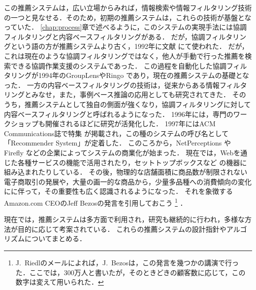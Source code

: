 この推薦システムは，広い立場からみれば，情報検索や情報フィルタリング技術の一つと見なせる．そのため，初期の推薦システムは，これらの技術が基盤となっていた．
\ref{chap:process}章で述べるように，このシステムの実現手法には協調フィルタリングと内容ベースフィルタリングがある．
だが，協調フィルタリングという語の方が推薦システムより古く，1992年に文献 \cite{macm:92:01} にて使われた．
だが，これは現在のような協調フィルタリングではなく，他人が手動で行った推薦を検索できる協調作業支援のシステムであった．
この過程を自動化した協調フィルタリングが1994年のGroupLens\cite{cscw:94:01}やRingo \cite{sigchi:95:02}であり，現在の推薦システムの基礎となった．
一方の内容ベースフィルタリングの技術は，従来からある情報フィルタリングとみなせ，また，事例ベース推論の応用としても研究されてきた．
そのうち，推薦システムとして独自の側面が強くなり，協調フィルタリングに対して内容ベースフィルタリングと呼ばれるようになった．
1996年には，専門のワークショップも開催されるほどに研究が活発化した．
1997年にはACM Communications誌で特集\cite{macm:97:01} が掲載され，この種のシステムの呼び名として「Recommender System」が定着した．
このころから，NetPerceptions や Firefly などの企業によってシステムの商業化が始まった．
現在では，Webを通じた各種サービスの機能で活用されたり\cite{ieeem:99:02,ieeem:03:01,www:07:01}，セットトップボックスなど
の機器に組み込まれたり\cite{kdd:04:11}している．
その後，物理的な店舗面積に商品数が制限されない電子商取引の発展や，大量の画一的な商品から，少量多品種への消費傾向の変化にに伴って，その重要性も広く認識されるようになった．
それを象徴する Amazon.com CEOのJeff Bezosの発言を引用しておこう\cite{dmkd:01:01}%
\footnote{J.~Riedlのメールによれば，J.~Bezosは，この発言を幾つかの講演で行った．ここでは，300万人と書いたが，そのときどきの顧客数に応じて，この数字は変えて用いられた．} ．
\begin{center}
\setlength{\fboxsep}{1zw}
\end{center}
現在では，推薦システムは多方面で利用され，研究も継続的に行われ，多様な方法が目的に応じて考案されている．
これらの推薦システムの設計指針やアルゴリズムについてまとめる．
